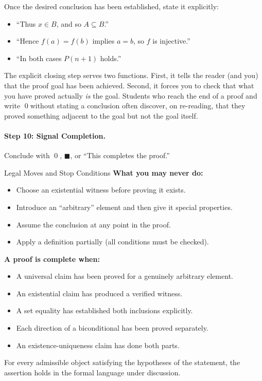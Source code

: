 Once the desired conclusion has been established, state it explicitly:

\begin{itemize}[itemsep=2pt]
  \item ``Thus $x \in B$, and so $A \subseteq B$.''
  \item ``Hence $f(a) = f(b)$ implies $a = b$, so $f$ is injective.''
  \item ``In both cases $P(n+1)$ holds.''
\end{itemize}

The explicit closing step serves two functions. First, it tells the reader
(and you) that the proof goal has been achieved. Second, it forces you to
check that what you have proved actually \emph{is} the goal. Students who
reach the end of a proof and write \qed without stating a conclusion often
discover, on re-reading, that they proved something adjacent to the goal
but not the goal itself.

\paragraph{Step 10: Signal Completion.}

Conclude with \qed, $\blacksquare$, or ``This completes the proof.''

\bigskip

\begin{propositionbox}{Legal Moves and Stop Conditions}
\textbf{What you may never do:}
\begin{itemize}[itemsep=2pt]
  \item Choose an existential witness before proving it exists.
  \item Introduce an ``arbitrary'' element and then give it special properties.
  \item Assume the conclusion at any point in the proof.
  \item Apply a definition partially (all conditions must be checked).
\end{itemize}

\medskip
\textbf{A proof is complete when:}
\begin{itemize}[itemsep=2pt]
  \item A universal claim has been proved for a genuinely arbitrary element.
  \item An existential claim has produced a verified witness.
  \item A set equality has established both inclusions explicitly.
  \item Each direction of a biconditional has been proved separately.
  \item An existence-uniqueness claim has done both parts.
\end{itemize}
\end{propositionbox}
\begin{remark*}
For every admissible object satisfying the hypotheses of the statement, the
assertion holds in the formal language under discussion.
\end{remark*}

